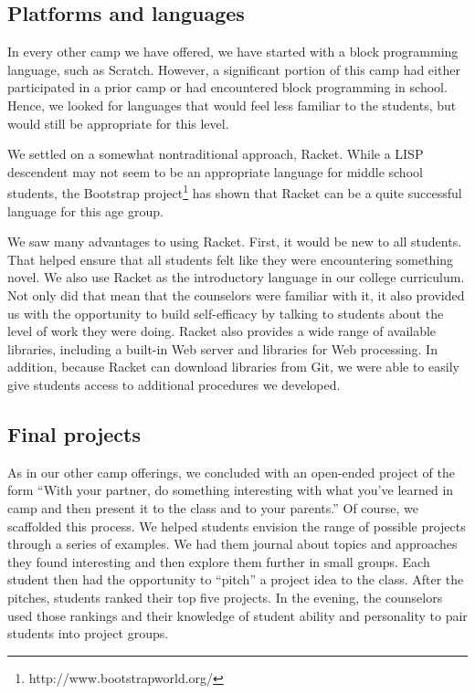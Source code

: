 \subsection{Platforms and languages}

In every other camp we have offered, we have started with a block
programming language, such as Scratch.  However, a significant
portion of this camp had either participated in a prior camp or had
encountered block programming in school.  Hence, we looked for
languages that would feel less familiar to the students, but would
still be appropriate for this level.

We settled on a somewhat nontraditional approach, Racket.  While a
LISP descendent may not seem to be an appropriate language for
middle school students, the Bootstrap
project\footnote{http://www.bootstrapworld.org/} has shown that
Racket can be a quite successful language for this age group.

We saw many advantages to using Racket.  First, it would be new to
all students.  That helped ensure that all students felt like they
were encountering something novel.  We also use Racket as the
introductory language in our college curriculum.  Not only did that
mean that the counselors were familiar with it, it also provided
us with the opportunity to build self-efficacy by talking to students
about the level of work they were doing.  Racket also provides a
wide range of available libraries, including a built-in Web server
and libraries for Web processing.  In addition, because Racket can
download libraries from Git, we were able to easily give students
access to additional procedures we developed.

\subsection{Final projects}

As in our other camp offerings, we concluded with an open-ended
project of the form ``With your partner, do something interesting
with what you've learned in camp and then present it to the class
and to your parents.'' Of course, we scaffolded this process.  We
helped students envision the range of possible projects through a
series of examples.  We had them journal about topics and approaches
they found interesting and then explore them further in small groups.
Each student then had the opportunity to ``pitch'' a project idea
to the class.  After the pitches, students ranked their top five
projects.  In the evening, the counselors used those rankings and
their knowledge of student ability and personality to pair students
into project groups.

